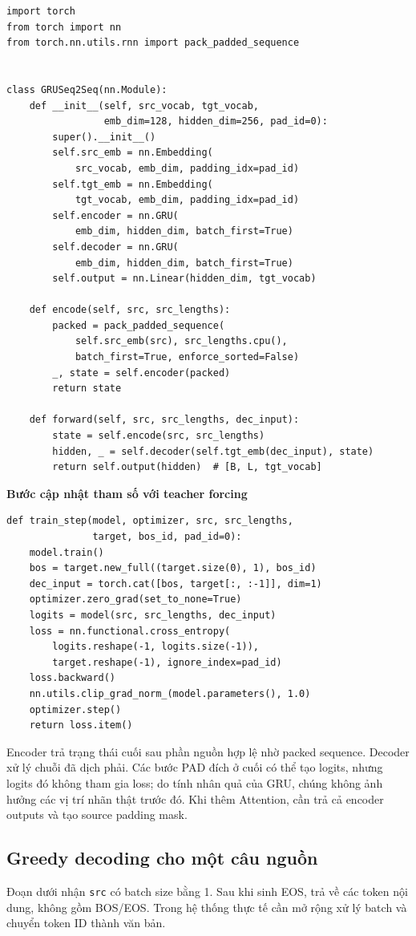 \documentclass[11pt,a4paper]{article}
\numberwithin{equation}{section}
\begin{document}
\begin{lstlisting}
import torch
from torch import nn
from torch.nn.utils.rnn import pack_padded_sequence


class GRUSeq2Seq(nn.Module):
    def __init__(self, src_vocab, tgt_vocab,
                 emb_dim=128, hidden_dim=256, pad_id=0):
        super().__init__()
        self.src_emb = nn.Embedding(
            src_vocab, emb_dim, padding_idx=pad_id)
        self.tgt_emb = nn.Embedding(
            tgt_vocab, emb_dim, padding_idx=pad_id)
        self.encoder = nn.GRU(
            emb_dim, hidden_dim, batch_first=True)
        self.decoder = nn.GRU(
            emb_dim, hidden_dim, batch_first=True)
        self.output = nn.Linear(hidden_dim, tgt_vocab)

    def encode(self, src, src_lengths):
        packed = pack_padded_sequence(
            self.src_emb(src), src_lengths.cpu(),
            batch_first=True, enforce_sorted=False)
        _, state = self.encoder(packed)
        return state

    def forward(self, src, src_lengths, dec_input):
        state = self.encode(src, src_lengths)
        hidden, _ = self.decoder(self.tgt_emb(dec_input), state)
        return self.output(hidden)  # [B, L, tgt_vocab]
\end{lstlisting}
\textbf{Bước cập nhật tham số với teacher forcing}
\begin{lstlisting}
def train_step(model, optimizer, src, src_lengths,
               target, bos_id, pad_id=0):
    model.train()
    bos = target.new_full((target.size(0), 1), bos_id)
    dec_input = torch.cat([bos, target[:, :-1]], dim=1)
    optimizer.zero_grad(set_to_none=True)
    logits = model(src, src_lengths, dec_input)
    loss = nn.functional.cross_entropy(
        logits.reshape(-1, logits.size(-1)),
        target.reshape(-1), ignore_index=pad_id)
    loss.backward()
    nn.utils.clip_grad_norm_(model.parameters(), 1.0)
    optimizer.step()
    return loss.item()
\end{lstlisting}
Encoder trả trạng thái cuối sau phần nguồn hợp lệ nhờ packed sequence. Decoder xử lý chuỗi đã dịch phải. Các bước PAD đích ở cuối có thể tạo logits, nhưng logits đó không tham gia loss; do tính nhân quả của GRU, chúng không ảnh hưởng các vị trí nhãn thật trước đó. Khi thêm Attention, cần trả cả encoder outputs và tạo source padding mask.

\subsection{Greedy decoding cho một câu nguồn}
Đoạn dưới nhận \texttt{src} có batch size bằng 1. Sau khi sinh EOS, trả về các token nội dung, không gồm BOS/EOS. Trong hệ thống thực tế cần mở rộng xử lý batch và chuyển token ID thành văn bản.
\end{document}
